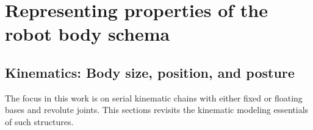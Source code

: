 
\section{Representing properties of the robot body schema}



\subsection{Kinematics: Body size, position, and posture}
The focus in this work is on serial kinematic chains with either fixed or floating bases and revolute joints. This sections revisits the kinematic modeling essentials of such structures.

